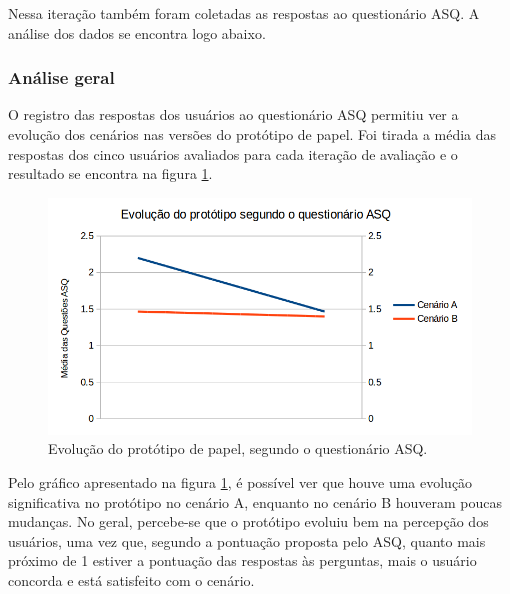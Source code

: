       Nessa iteração também foram coletadas as respostas ao questionário ASQ. A análise dos dados se encontra logo abaixo.
    
    \subsubsection{Análise geral}
    
      O registro das respostas dos usuários ao questionário ASQ permitiu ver a evolução dos cenários nas versões do 
      protótipo de papel. Foi tirada a média das respostas dos cinco usuários avaliados para cada iteração de avaliação
      e o resultado se encontra na figura \ref{evolucao_prototipo_papel_ASQ}.
      
      \begin{figure}[!htpb]
	\centering
	\includegraphics[scale=0.35]{editaveis/figuras/evolucao_prototipo_papel_ASQ}
	\caption[Evolução do protótipo de papel, segundo o questionário ASQ]
	  {Evolução do protótipo de papel, segundo o questionário ASQ.}
	\label{evolucao_prototipo_papel_ASQ}
      \end{figure}
      
      Pelo gráfico apresentado na figura \ref{evolucao_prototipo_papel_ASQ}, é possível ver que houve uma evolução significativa
      no protótipo no cenário A, enquanto no cenário B houveram poucas mudanças. No geral, percebe-se que o protótipo evoluiu
      bem na percepção dos usuários, uma vez que, segundo a pontuação proposta pelo ASQ, quanto mais próximo de 1 estiver
      a pontuação das respostas às perguntas, mais o usuário concorda e está satisfeito com o cenário.